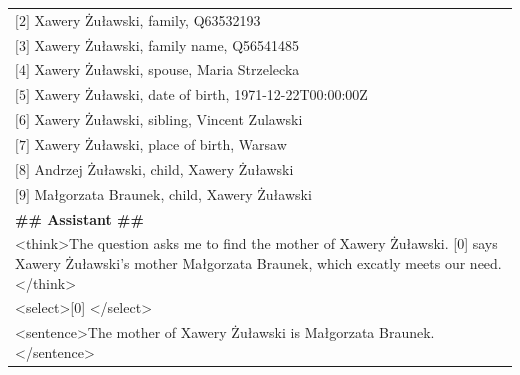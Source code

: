 \begin{table}[h!]
{\begin{tabular}{p{\textwidth}}
$\text{[2]}$ Xawery Żuławski, family, Q63532193\\
$\text{[3]}$ Xawery Żuławski, family name, Q56541485\\
$\text{[4]}$ Xawery Żuławski, spouse, Maria Strzelecka\\
$\text{[5]}$ Xawery Żuławski, date of birth, 1971-12-22T00:00:00Z\\
$\text{[6]}$ Xawery Żuławski, sibling, Vincent Zulawski\\
$\text{[7]}$ Xawery Żuławski, place of birth, Warsaw\\
$\text{[8]}$ Andrzej Żuławski, child, Xawery Żuławski\\
$\text{[9]}$ Małgorzata Braunek, child, Xawery Żuławski\\
\midrule
\textbf{\#\# Assistant \#\#} \\
\textless think\textgreater The question asks me to find the mother of Xawery Żuławski. [0] says Xawery Żuławski's mother Małgorzata Braunek, which excatly meets our need. \textless /think\textgreater\\
\textless select\textgreater [0] \textless /select\textgreater \\
\textless sentence\textgreater The mother of Xawery Żuławski is Małgorzata Braunek. \textless /sentence\textgreater \\
\bottomrule
\end{tabular}
}
\label{worker_kbqa}
\end{table}